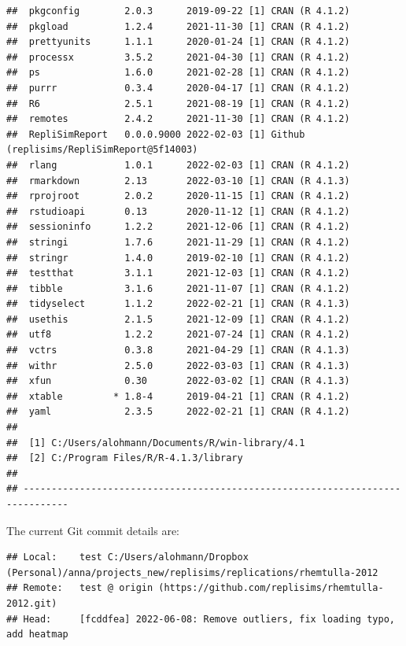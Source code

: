 \documentclass[10,a4paperpaper,]{article}
\begin{document}
\begin{verbatim}
##  pkgconfig        2.0.3      2019-09-22 [1] CRAN (R 4.1.2)
##  pkgload          1.2.4      2021-11-30 [1] CRAN (R 4.1.2)
##  prettyunits      1.1.1      2020-01-24 [1] CRAN (R 4.1.2)
##  processx         3.5.2      2021-04-30 [1] CRAN (R 4.1.2)
##  ps               1.6.0      2021-02-28 [1] CRAN (R 4.1.2)
##  purrr            0.3.4      2020-04-17 [1] CRAN (R 4.1.2)
##  R6               2.5.1      2021-08-19 [1] CRAN (R 4.1.2)
##  remotes          2.4.2      2021-11-30 [1] CRAN (R 4.1.2)
##  RepliSimReport   0.0.0.9000 2022-02-03 [1] Github (replisims/RepliSimReport@5f14003)
##  rlang            1.0.1      2022-02-03 [1] CRAN (R 4.1.2)
##  rmarkdown        2.13       2022-03-10 [1] CRAN (R 4.1.3)
##  rprojroot        2.0.2      2020-11-15 [1] CRAN (R 4.1.2)
##  rstudioapi       0.13       2020-11-12 [1] CRAN (R 4.1.2)
##  sessioninfo      1.2.2      2021-12-06 [1] CRAN (R 4.1.2)
##  stringi          1.7.6      2021-11-29 [1] CRAN (R 4.1.2)
##  stringr          1.4.0      2019-02-10 [1] CRAN (R 4.1.2)
##  testthat         3.1.1      2021-12-03 [1] CRAN (R 4.1.2)
##  tibble           3.1.6      2021-11-07 [1] CRAN (R 4.1.2)
##  tidyselect       1.1.2      2022-02-21 [1] CRAN (R 4.1.3)
##  usethis          2.1.5      2021-12-09 [1] CRAN (R 4.1.2)
##  utf8             1.2.2      2021-07-24 [1] CRAN (R 4.1.2)
##  vctrs            0.3.8      2021-04-29 [1] CRAN (R 4.1.3)
##  withr            2.5.0      2022-03-03 [1] CRAN (R 4.1.3)
##  xfun             0.30       2022-03-02 [1] CRAN (R 4.1.3)
##  xtable         * 1.8-4      2019-04-21 [1] CRAN (R 4.1.2)
##  yaml             2.3.5      2022-02-21 [1] CRAN (R 4.1.2)
## 
##  [1] C:/Users/alohmann/Documents/R/win-library/4.1
##  [2] C:/Program Files/R/R-4.1.3/library
## 
## ------------------------------------------------------------------------------
\end{verbatim}

The current Git commit details are:

\begin{verbatim}
## Local:    test C:/Users/alohmann/Dropbox (Personal)/anna/projects_new/replisims/replications/rhemtulla-2012
## Remote:   test @ origin (https://github.com/replisims/rhemtulla-2012.git)
## Head:     [fcddfea] 2022-06-08: Remove outliers, fix loading typo, add heatmap
\end{verbatim}
\end{document}
